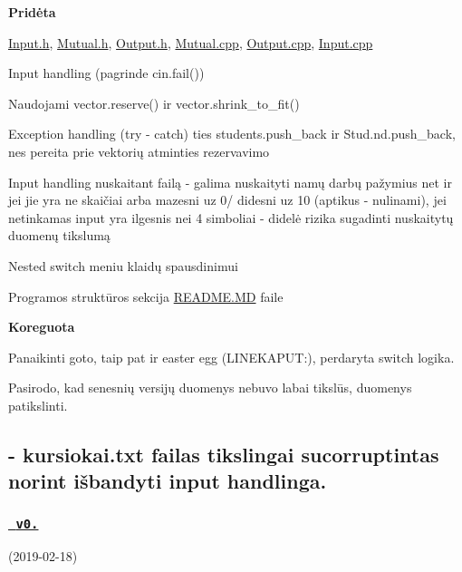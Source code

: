 {\bfseries{Pridėta}}
\begin{DoxyItemize}
\item {\ttfamily \mbox{\hyperlink{_input_8h}{Input.\+h}}, \mbox{\hyperlink{_mutual_8h}{Mutual.\+h}}, \mbox{\hyperlink{_output_8h}{Output.\+h}}, \mbox{\hyperlink{_mutual_8cpp}{Mutual.\+cpp}}, \mbox{\hyperlink{_output_8cpp}{Output.\+cpp}}, \mbox{\hyperlink{_input_8cpp}{Input.\+cpp}}}
\item Input handling (pagrinde {\ttfamily cin.\+fail()})
\item Naudojami {\ttfamily vector.\+reserve()} ir {\ttfamily vector.\+shrink\+\_\+to\+\_\+fit()}
\item Exception handling ({\ttfamily try -\/ catch}) ties {\ttfamily students.\+push\+\_\+back} ir {\ttfamily Stud.\+nd.\+push\+\_\+back}, nes pereita prie vektorių atminties rezervavimo
\item Input handling nuskaitant failą -\/ galima nuskaityti namų darbų pažymius net ir jei jie yra ne skaičiai arba mazesni uz 0/ didesni uz 10 (aptikus -\/ nulinami), jei netinkamas input yra ilgesnis nei 4 simboliai -\/ didelė rizika sugadinti nuskaitytų duomenų tikslumą
\item Nested switch meniu klaidų spausdinimui
\item Programos struktūros sekcija \mbox{\hyperlink{_r_e_a_d_m_e_8md}{R\+E\+A\+D\+M\+E.\+MD}} faile
\item 
\end{DoxyItemize}

{\bfseries{Koreguota}}
\begin{DoxyItemize}
\item Panaikinti goto, taip pat ir easter egg (L\+I\+N\+E\+K\+A\+P\+UT\+:), perdaryta switch logika.
\item Pasirodo, kad senesnių versijų duomenys nebuvo labai tikslūs, duomenys patikslinti. \subsection*{-\/ kursiokai.\+txt failas tikslingai sucorruptintas norint išbandyti input handling\textquotesingle{}a. }
\end{DoxyItemize}

\subsubsection*{\href{https://github.com/gitguuddd/Obj_Duomenu_apdorojimas/releases/tag/v0.2}{\texttt{ v0.}}}

(2019-\/02-\/18)

